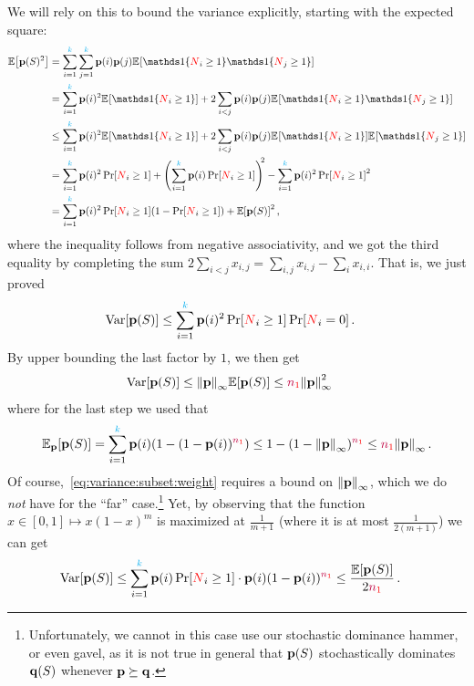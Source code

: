 We will rely on this to bound the variance explicitly, starting with the expected square:
\begin{align*}
  \expect{\p(S)^2} 
  &= \sum_{i=1}^\ab\sum_{j=1}^\ab \p(i)\p(j) \bEE{\indic{\occur_i \geq 1}\indic{\occur_j \geq 1}} \\
  &= \sum_{i=1}^\ab\p(i)^2 \bEE{\indic{\occur_i \geq 1}} + 2\sum_{i< j} \p(i)\p(j) \bEE{\indic{\occur_i \geq 1}\indic{\occur_j \geq 1}} \\
  &\leq \sum_{i=1}^\ab\p(i)^2 \bEE{\indic{\occur_i \geq 1}} + 2\sum_{i< j} \p(i)\p(j) \bEE{\indic{\occur_i \geq 1}}\bEE{\indic{\occur_j \geq 1}} \\
  &= \sum_{i=1}^\ab\p(i)^2 \bPr{\occur_i \geq 1} + \Paren{\sum_{i=1}^\ab \p(i)\bPr{\occur_i \geq 1} }^{\!\!2} - \sum_{i=1}^\ab\p(i)^2 \bPr{\occur_i \geq 1}^2 \\
  &= \sum_{i=1}^\ab\p(i)^2 \bPr{\occur_i \geq 1}(1-\bPr{\occur_i \geq 1}) + \expect{\p(S)}^2\,,
\end{align*}
where the inequality follows from negative associativity, and we got the third equality by completing the sum $2\sum_{i<j} x_{i,j} = \sum_{i,j} x_{i,j} - \sum_{i} x_{i,i}$. That is, we just proved
\begin{align}
  \Var[\p(S)]
  &\leq \sum_{i=1}^\ab\p(i)^2 \bPr{\occur_i \geq 1}\bPr{\occur_i = 0}\,.
\end{align}
By upper bounding the last factor by $1$, we then get
\begin{align}
  \Var[\p(S)]
  &\leq \norminf{\p}\expect{\p(S)} \leq \nss\norminf{\p}^2\, \label{eq:variance:subset:weight}
\end{align}
where for the last step we used that
\[
\bE{\p}{\p(S)} = \sum_{i=1}^\ab \p(i) (1-(1-\p(i))^{\nss}) %
\leq 1-(1-\norminf{\p})^{\nss}
\leq \nss\norminf{\p}\,.
\]
Of course,~\cref{eq:variance:subset:weight} requires a bound on $\norminf{\p}$, which we do \emph{not} have for the ``far'' case.\footnote{Unfortunately, we cannot in this case use our stochastic dominance hammer, or even gavel, as it is not true in general that $\mathbf{p}(S)$ stochastically dominates $\mathbf{q}(S)$ whenever $\mathbf{p}\succeq\mathbf{q}$.} Yet, by observing that the function $x\in[0,1]\mapsto x(1-x)^m$ is maximized at $\frac{1}{m+1}$ (where it is at most $\frac{1}{2(m+1)}$) we can get
\begin{align}
  \Var[\p(S)]
  &\leq \sum_{i=1}^\ab\p(i) \bPr{\occur_i \geq 1} \cdot \p(i) (1-\p(i))^{\nss}
  \leq \frac{\expect{\p(S)}}{2\nss}\,.
\end{align}

